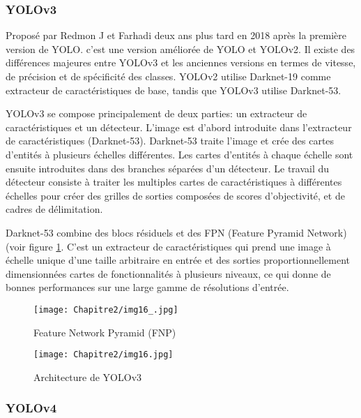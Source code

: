 \subsubsection{YOLOv3 \cite{yolov3_paper}} 

Proposé par Redmon J et Farhadi deux ans plus tard en 2018 après la première version de YOLO. c'est une version améliorée de YOLO et YOLOv2. Il existe des différences majeures entre YOLOv3 et les anciennes versions en termes de vitesse, de précision et de spécificité des classes. YOLOv2 utilise Darknet-19 comme extracteur de caractéristiques de base, tandis que YOLOv3 utilise Darknet-53.  

YOLOv3 se compose principalement de deux parties: un extracteur de caractéristiques et un détecteur. L'image est d'abord introduite dans l'extracteur de caractéristiques  (Darknet-53). Darknet-53 traite l'image et crée des cartes d'entités à plusieurs échelles différentes. Les cartes d'entités à chaque échelle sont ensuite introduites dans des branches séparées d'un détecteur. Le travail du détecteur consiste à traiter les multiples cartes de caractéristiques à différentes échelles pour créer des grilles de sorties composées de scores d'objectivité, et de cadres de délimitation.  
    
Darknet-53  combine des blocs résiduels et des FPN (Feature Pyramid Network) (voir figure \ref{img16_}. C'est un extracteur de caractéristiques qui prend une image à échelle unique d'une taille arbitraire en entrée et des sorties proportionnellement dimensionnées cartes de fonctionnalités à plusieurs niveaux, ce qui donne de bonnes performances sur une large gamme de résolutions d'entrée.


     \begin{figure}[H]
          \centering
          \texttt{[image: Chapitre2/img16\_.jpg]}
          \caption{Feature Network Pyramid (FNP)}
          \label{img16_}
          \end{figure}
     \begin{figure}[H]
          \centering
          \texttt{[image: Chapitre2/img16.jpg]}
          \caption{Architecture de YOLOv3}
          \label{img16}
          \end{figure}
     

\subsubsection{YOLOv4 \cite{yolov4_paper} }

